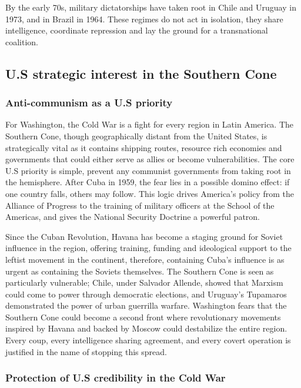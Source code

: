By the early 70s, military dictatorships have taken root in Chile and Uruguay  in 1973, and in Brazil in 1964. These regimes do not act in isolation, they share intelligence, coordinate repression and lay the ground for a transnational coalition.

\subsection{U.S strategic interest in the Southern Cone}

\subsubsection{Anti-communism as a U.S priority}

For Washington, the Cold War is a fight for every region in Latin America. The Southern Cone, though geographically distant from the United States, is strategically vital as it contains shipping routes, resource rich economies and governments that could either serve as allies or become vulnerabilities. The core U.S priority is simple, prevent any communist governments from taking root in the hemisphere. After Cuba in 1959, the fear lies in a possible domino effect: if one country falls, others may follow. This logic drives America's policy from the Alliance of Progress to the training of military officers at the School of the Americas, and gives the National Security Doctrine a powerful patron.

Since the Cuban Revolution, Havana has become a staging ground for Soviet influence in the region, offering training, funding and ideological support to the leftist movement in the continent, therefore, containing Cuba's influence is as urgent as containing the Soviets themselves. The Southern Cone is seen as particularly vulnerable; Chile, under Salvador Allende, showed that Marxism could come to power through democratic elections, and Uruguay's Tupamaros demonstrated the power of urban guerrilla warfare. Washington fears that the Southern Cone could become a second front where revolutionary movements inspired by Havana and backed by Moscow could destabilize the entire region. Every coup, every intelligence sharing agreement, and every covert operation is justified in the name of stopping this spread.

\subsubsection{Protection of U.S credibility in the Cold War}

